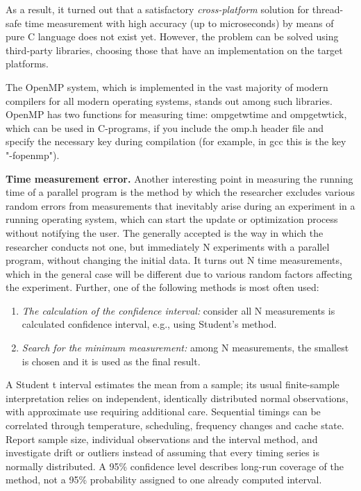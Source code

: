 {	\par As a result, it turned out that a satisfactory \textit{cross-platform} solution for thread-safe time measurement with high accuracy (up to microseconds) by means of pure C language does not exist yet. However, the problem can be solved using third-party libraries, choosing those that have an implementation on the target platforms.
	\par The OpenMP system, which is implemented in the vast majority of modern compilers for all modern operating systems, stands out among such libraries. OpenMP has two functions for measuring time: omp\textunderscore get\textunderscore wtime and omp\textunderscore get\textunderscore wtick, which can be used in C-programs, if you include the omp.h header file and specify the necessary key during compilation (for example, in gcc this is the key "{}-fopenmp").
	\par\textbf{Time measurement error.} Another interesting point in measuring the running time of a parallel program is the method by which the researcher excludes various random errors from measurements that inevitably arise during an experiment in a running operating system, which can start the update or optimization process without notifying the user. The generally accepted is the way in which the researcher conducts not one, but immediately N experiments with a parallel program, without changing the initial data. It turns out N time measurements, which in the general case will be different due to various random factors affecting the experiment. Further, one of the following methods is most often used:
	\begin{enumerate}
		\item\textit{The calculation of the confidence interval:} consider all N measurements is calculated confidence interval, e.g., using Student's method.
		\item\textit{Search for the minimum measurement:} among N measurements, the smallest is chosen and it is used as the final result.
	\end{enumerate}
	\par A Student t interval estimates the mean from a sample; its usual finite-sample interpretation relies on independent, identically distributed normal observations, with approximate use requiring additional care. Sequential timings can be correlated through temperature, scheduling, frequency changes and cache state. Report sample size, individual observations and the interval method, and investigate drift or outliers instead of assuming that every timing series is normally distributed. A 95\% confidence level describes long-run coverage of the method, not a 95\% probability assigned to one already computed interval.
}
